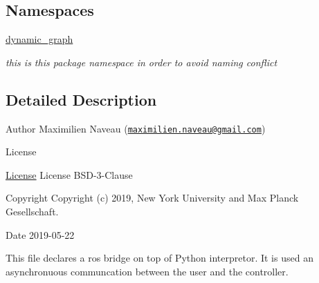 \subsection*{Namespaces}
\begin{DoxyCompactItemize}
\item 
 \hyperlink{namespacedynamic__graph}{dynamic\+\_\+graph}
\begin{DoxyCompactList}\small\item\em this is this package namespace in order to avoid naming conflict \end{DoxyCompactList}\end{DoxyCompactItemize}


\subsection{Detailed Description}
\begin{DoxyAuthor}{Author}
Maximilien Naveau (\href{mailto:maximilien.naveau@gmail.com}{\tt maximilien.\+naveau@gmail.\+com}) 
\end{DoxyAuthor}
\begin{DoxyRefDesc}{License}
\item[\hyperlink{license__license000016}{License}]License B\+S\+D-\/3-\/\+Clause \end{DoxyRefDesc}
\begin{DoxyCopyright}{Copyright}
Copyright (c) 2019, New York University and Max Planck Gesellschaft. 
\end{DoxyCopyright}
\begin{DoxyDate}{Date}
2019-\/05-\/22
\end{DoxyDate}
This file declares a ros bridge on top of Python interpretor. It is used an asynchronuous communcation between the user and the controller. 